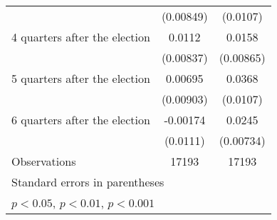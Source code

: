 \begin{table}[htbp]
\begin{tabular}{l*{2}{c}}
                    &   (0.00849)         &    (0.0107)         \\
[1em]
 4 quarters after the election&      0.0112         &      0.0158         \\
                    &   (0.00837)         &   (0.00865)         \\
[1em]
 5 quarters after the election&     0.00695         &      0.0368\sym{***}\\
                    &   (0.00903)         &    (0.0107)         \\
[1em]
 6 quarters after the election&    -0.00174         &      0.0245\sym{***}\\
                    &    (0.0111)         &   (0.00734)         \\
\hline
Observations        &       17193         &       17193         \\
\hline\hline
\multicolumn{3}{l}{\footnotesize Standard errors in parentheses}\\
\multicolumn{3}{l}{\footnotesize \sym{*} \(p<0.05\), \sym{**} \(p<0.01\), \sym{***} \(p<0.001\)}\\
\end{tabular}
\end{table}

